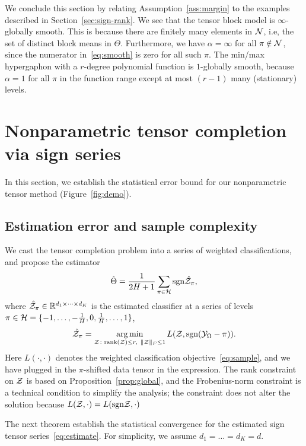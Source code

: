 \documentclass{article}
\theoremstyle{plain}
\theoremstyle{definition}
\def\sign{\textup{sgn}}
\begin{document}
We conclude this section by relating Assumption~\ref{ass:margin} to the examples described in Section~\ref{sec:sign-rank}. 
We see that the tensor block model is $\infty$-globally smooth. This is because there are finitely many elements in $\mathcal{N}$, i.e, the set of distinct block means in $\Theta$. Furthermore, we have $\alpha= \infty$ for all $\pi \notin \mathcal{N}$, since the numerator in~\eqref{eq:smooth} is zero for all such $\pi$. The min/max hypergaphon with a $r$-degree polynomial function is $1$-globally smooth, because $\alpha=1$ for all $\pi$ in the function range except at most $(r-1)$ many (stationary) levels. 




\section{Nonparametric tensor completion via sign series}\label{sec:estimation}
In this section, we establish the statistical error bound for our nonparametric tensor method (Figure~\ref{fig:demo}). 

\subsection{Estimation error and sample complexity}
We cast the tensor completion problem into a series of weighted classifications, and propose the estimator
\begin{equation}\label{eq:est}
\hat \Theta = {1\over 2H+1}\sum_{\pi \in \tH}\sign{\hat \tZ_\pi},
\end{equation}
where $\hat {\mathcal{Z}}_\pi\in\mathbb{R}^{d_1\times \dots\times d_K}$ is the estimated classifier at a series of levels $\pi \in \mathcal{H}=\{-1,\ldots,-{1\over H}, 0, {1\over H},\ldots,1\}$,
\begin{equation}\label{eq:estimate}
\hat \tZ_\pi = \argmin_{\tZ\colon \text{rank}(\tZ)\leq r, \ \FnormSize{}{\tZ}\leq 1} L(\tZ, \sign(\tY_\Omega-\pi)).
\end{equation}
Here $L(\cdot,\cdot)$ denotes the weighted classification objective~\eqref{eq:sample}, and we have plugged in the $\pi$-shifted data tensor in the expression. The rank constraint on $\mathcal{Z}$ is based on Proposition~\ref{prop:global}, and the Frobenius-norm constraint is a technical condition to simplify the analysis; the constraint does not alter the solution because $L(\tZ,\cdot)=L(\sign \tZ,\cdot)$ 

The next theorem establish the statistical convergence for the estimated sign tensor series~\eqref{eq:estimate}. For simplicity, we assume $d_1=\ldots=d_K=d$.
\end{document}
